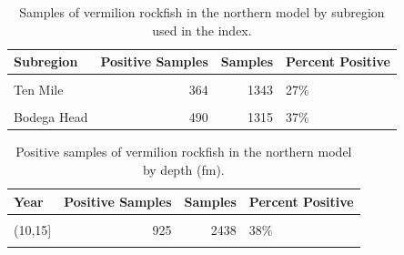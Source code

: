 \documentclass[11pt,
  english,
]{article}
\begin{document}
\begin{table}

\caption{\label{tab:tab-region-ccfrp}Samples of vermilion rockfish in the northern model by subregion used in the index.}
\centering
\begin{tabular}[t]{lrrl}
\toprule
Subregion & Positive Samples & Samples & Percent Positive\\
\midrule
\cellcolor{gray!6}{South Cape Mendocino} & \cellcolor{gray!6}{474} & \cellcolor{gray!6}{1854} & \cellcolor{gray!6}{26\%}\\
Ten Mile & 364 & 1343 & 27\%\\
\cellcolor{gray!6}{Stewarts Point} & \cellcolor{gray!6}{599} & \cellcolor{gray!6}{932} & \cellcolor{gray!6}{64\%}\\
Bodega Head & 490 & 1315 & 37\%\\
\bottomrule
\end{tabular}
\end{table}

\begin{table}

\caption{\label{tab:tab-depth-ccfrp}Positive samples of vermilion rockfish in the northern model by depth (fm).}
\centering
\begin{tabular}[t]{lrrl}
\toprule
Year & Positive Samples & Samples & Percent Positive\\
\midrule
\cellcolor{gray!6}{(0,10]} & \cellcolor{gray!6}{356} & \cellcolor{gray!6}{1589} & \cellcolor{gray!6}{22\%}\\
(10,15] & 925 & 2438 & 38\%\\
\cellcolor{gray!6}{(15,20]} & \cellcolor{gray!6}{646} & \cellcolor{gray!6}{1417} & \cellcolor{gray!6}{46\%}\\
\bottomrule
\end{tabular}
\end{table}
\end{document}
